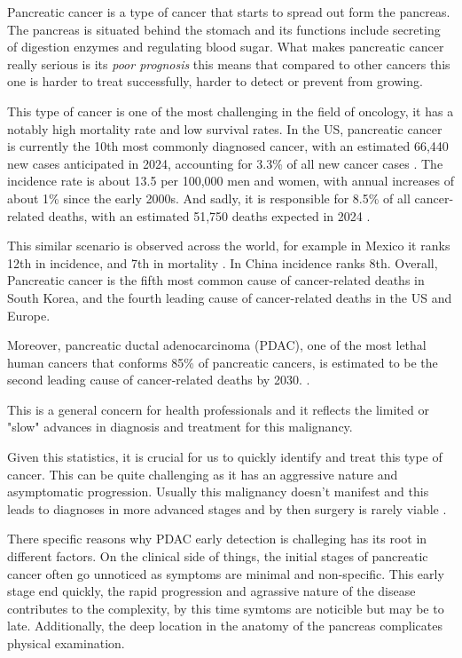 Pancreatic cancer is a type of cancer that starts to spread out form the pancreas. The pancreas is situated behind the stomach and its functions include secreting of digestion enzymes and regulating blood sugar. What makes pancreatic cancer really serious is its \textit{poor prognosis} this means that compared to other cancers this one is harder to treat successfully, harder to detect or prevent from growing.

This type of cancer is one of the most challenging in the field of oncology, it has a notably high mortality rate and low survival rates. In the US, pancreatic cancer is currently the 10th most commonly diagnosed cancer, with an estimated 66,440 new cases anticipated in 2024, accounting for 3.3\% of all new cancer cases \cite{SEER2024}. The incidence rate is about 13.5 per 100,000 men and women, with annual increases of about 1\% since the early 2000s. And sadly, it is responsible for 8.5\% of all cancer-related deaths, with an estimated 51,750 deaths expected in 2024 \cite{SEER2024}.

This similar scenario is observed across the world, for example in Mexico it ranks 12th in incidence, and 7th in mortality \cite{GlobocanMexico}. In China incidence ranks 8th. Overall, Pancreatic cancer is the fifth most common cause of cancer-related deaths in South Korea, and the fourth leading cause of cancer-related deaths in the US and Europe. \cite{NCCNGuidelines}

Moreover, pancreatic ductal adenocarcinoma (PDAC), one of the most lethal human cancers that conforms 85\% of pancreatic cancers, is estimated to be the second leading cause of cancer-related deaths by 2030. \cite{Li2022}\cite{Cancers2023}.

This is a general concern for health professionals and it reflects the limited or "slow" advances in diagnosis and treatment for this malignancy.


Given this statistics, it is crucial for us to quickly identify and treat this type of cancer. This can be quite challenging as it has an aggressive nature and asymptomatic progression. Usually this malignancy doesn't manifest and this leads to diagnoses in more advanced stages and by then surgery is rarely viable \cite{Pubmed30721664}.

There specific reasons why PDAC early detection is challeging has its root in different factors. On the clinical side of things, the initial stages of pancreatic cancer often go unnoticed as symptoms are minimal and non-specific. This early stage end quickly, the rapid progression and agrassive nature of the disease contributes to the complexity, by this time symtoms are noticible but may be to late.   Additionally, the deep location in the anatomy of the pancreas complicates physical examination. 

